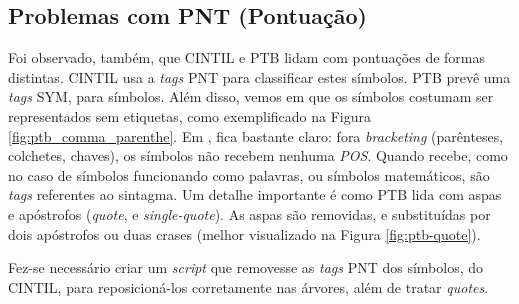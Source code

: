\subsection{Problemas com PNT (Pontuação)}
\label{subsec:cintil-pnt}
Foi observado, também, que CINTIL e PTB lidam com pontuações de formas distintas. CINTIL usa a \textit{tags} PNT para classificar estes símbolos. PTB prevê uma \textit{tags} SYM, para símbolos. Além disso, vemos em \cite[p~52]{buildingPTB} que os símbolos costumam ser representados sem etiquetas, como exemplificado na Figura \ref{fig:ptb_comma_parenthe}. Em \cite[p~52]{bracketing_ptb}, fica bastante claro: fora \textit{bracketing} (parênteses, colchetes, chaves), os símbolos não recebem nenhuma \textit{POS}. Quando recebe, como no caso de símbolos funcionando como palavras, ou símbolos matemáticos, são \textit{tags} referentes ao sintagma. Um detalhe importante é como PTB lida com aspas e apóstrofos (\textit{quote}, e \textit{single-quote}). As aspas são removidas, e substituídas por dois apóstrofos ou duas crases (melhor visualizado na Figura \ref{fig:ptb-quote}).

\begin{center}
    
\end{center}

\begin{center}
    
\end{center}

Fez-se necessário criar um \textit{script} que removesse as \textit{tags} PNT dos símbolos, do CINTIL, para reposicioná-los corretamente nas árvores, além de tratar \textit{quotes}.

